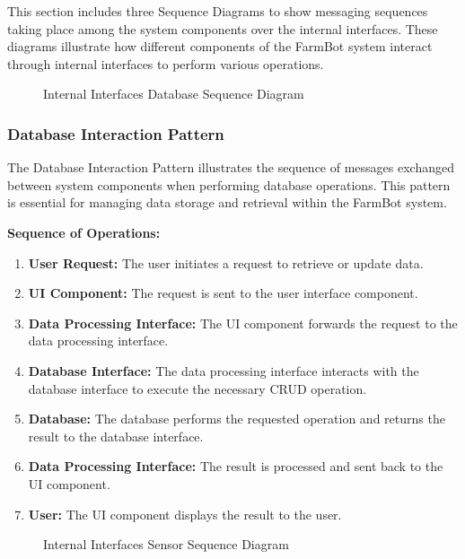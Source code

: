 This section includes three Sequence Diagrams to show messaging sequences taking place among the system components over the internal interfaces. These diagrams illustrate how different components of the FarmBot system interact through internal interfaces to perform various operations.

\begin{figure}[H]
    \centering
    
    \caption{Internal Interfaces Database Sequence Diagram}
\end{figure}

\subsubsection{Database Interaction Pattern}

The Database Interaction Pattern illustrates the sequence of messages exchanged between system components when performing database operations. This pattern is essential for managing data storage and retrieval within the FarmBot system.

\textbf{Sequence of Operations:}
\begin{enumerate}
    \item \textbf{User Request:} The user initiates a request to retrieve or update data.
    \item \textbf{UI Component:} The request is sent to the user interface component.
    \item \textbf{Data Processing Interface:} The UI component forwards the request to the data processing interface.
    \item \textbf{Database Interface:} The data processing interface interacts with the database interface to execute the necessary CRUD operation.
    \item \textbf{Database:} The database performs the requested operation and returns the result to the database interface.
    \item \textbf{Data Processing Interface:} The result is processed and sent back to the UI component.
    \item \textbf{User:} The UI component displays the result to the user.
\end{enumerate}

\begin{figure}[H]
    \centering
    
    \caption{Internal Interfaces Sensor Sequence Diagram}
\end{figure}


